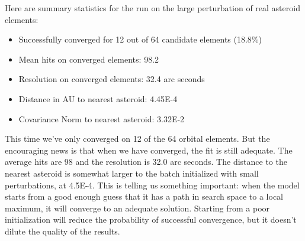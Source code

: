 Here are summary statistics for the run on the large perturbation of real asteroid elements:
\begin{itemize}
\item Successfully converged for 12 out of 64 candidate elements (18.8\%)
\item Mean hits on converged elements: 98.2
\item Resolution on converged elements: 32.4 arc seconds
\item Distance in AU to nearest asteroid: 4.45E-4
\item Covariance Norm to nearest asteroid: 3.32E-2
\end{itemize}
This time we've only converged on 12 of the 64 orbital elements.
But the encouraging news is that when we have converged, the fit is still adequate.
The average hits are 98 and the resolution is 32.0 arc seconds.
The distance to the nearest asteroid is somewhat larger to the batch initialized with small perturbations, at 4.5E-4.
This is telling us something important: 
when the model starts from a good enough guess that it has a path in search space to a local maximum, it will converge to an adequate solution.
Starting from a poor initialization will reduce the probability of successful convergence, but it doesn't dilute the quality of the results.
